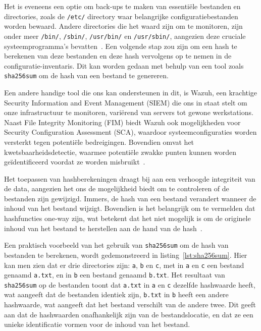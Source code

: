 Het is eveneens een optie om back-ups te maken van essenti\"ele bestanden en directories, zoals de \texttt{/etc/} directory waar belangrijke configuratiebestanden worden bewaard.
Andere directories die het waard zijn om te monitoren, zijn onder meer \texttt{/bin/}, \texttt{/sbin/}, \texttt{/usr/bin/} en \texttt{/usr/sbin/}, aangezien deze cruciale systeemprogramma's bevatten~\autocite{linuxfoundation-filesystem}.
Een volgende stap zou zijn om een hash te berekenen van deze bestanden en deze hash vervolgens op te nemen in de configuratie-inventaris.
Dit kan worden gedaan met behulp van een tool zoals \texttt{sha256sum} om de hash van een bestand te genereren.

Een andere handige tool die ons kan ondersteunen in dit, is Wazuh, een krachtige Security Information and Event Management (SIEM) die ons in staat stelt om onze infrastructuur te monitoren, variërend van servers tot gewone werkstations.
Naast File Integrity Monitoring (FIM) biedt Wazuh ook mogelijkheden voor Security Configuration Assessment (SCA), waardoor systeemconfiguraties worden versterkt tegen potentiële bedreigingen.
Bovendien omvat het kwetsbaarheidsdetectie, waarmee potentiële zwakke punten kunnen worden geïdentificeerd voordat ze worden misbruikt~\autocite{wazuh-overview}.

Het toepassen van hashberekeningen draagt bij aan een verhoogde integriteit van de data, aangezien het ons de mogelijkheid biedt om te controleren of de bestanden zijn gewijzigd.
Immers, de hash van een bestand verandert wanneer de inhoud van het bestand wijzigt.
Bovendien is het belangrijk om te vermelden dat hashfuncties one-way zijn, wat betekent dat het niet mogelijk is om de originele inhoud van het bestand te herstellen aan de hand van de hash~\autocite{herrero2021file}.

Een praktisch voorbeeld van het gebruik van \texttt{sha256sum} om de hash van bestanden te berekenen, wordt gedemonstreerd in listing~\ref{lst:sha256sum}.
Hier kan men zien dat er drie directories zijn: \texttt{a}, \texttt{b} en \texttt{c}, met in \texttt{a} en \texttt{c} een bestand genaamd \texttt{a.txt}, en in \texttt{b} een bestand genaamd \texttt{b.txt}.
Het resultaat van \texttt{sha256sum} op de bestanden toont dat \texttt{a.txt} in \texttt{a} en \texttt{c} dezelfde hashwaarde heeft, wat aangeeft dat de bestanden identiek zijn, \texttt{b.txt} in \texttt{b} heeft een andere hashwaarde, wat aangeeft dat het bestand verschilt van de andere twee.
Dit geeft aan dat de hashwaarden onafhankelijk zijn van de bestandslocatie, en dat ze een unieke identificatie vormen voor de inhoud van het bestand.

